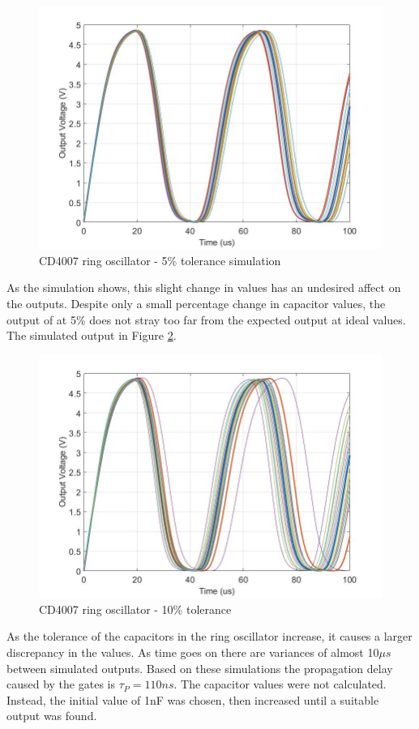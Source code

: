 \begin{figure}[H]
    \centering
        \centering
        \includegraphics[scale = .35]{CircuitDevelopment/cd4007SIM/ring_5_tolerance_20it.jpg}
        \caption{CD4007 ring oscillator - 5\% tolerance simulation}
        \label{fig:ringtol5}
\end{figure}

As the simulation shows, this slight change in values has an undesired affect on the outputs. Despite only a small percentage change in capacitor values, the output of at 5\% does not stray too far from the expected output at ideal values. The simulated output in Figure \ref{fig:ringtol10}.

\begin{figure}[H]
    \centering
        \centering
        \includegraphics[scale = .35]{CircuitDevelopment/cd4007SIM/ring_10_tolerance_20it.jpg}
        \caption{CD4007 ring oscillator - 10\% tolerance}
        \label{fig:ringtol10}
\end{figure} 

As the tolerance of the capacitors in the ring oscillator increase, it causes a larger discrepancy in the values. As time goes on there are variances of almost 10$\mu s$ between simulated outputs. Based on these simulations the propagation delay caused by the gates is $\tau _P = 110ns$. The capacitor values were not calculated. Instead, the initial value of 1nF was chosen, then increased until a suitable output was found.





